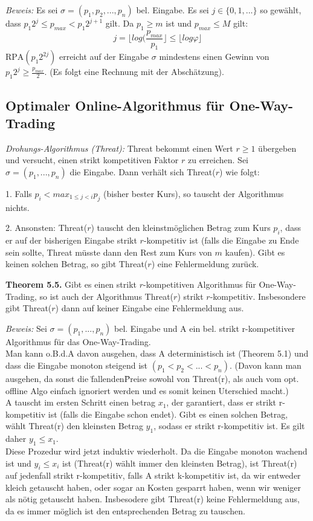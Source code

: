 \textit{Beweis:} Es sei $\sigma = (p_{1}, p_{2}, ..., p_{n})$ bel. Eingabe. Es sei $j \in \{0, 1, ...\}$ so gewählt, dass $p_{1}2^{j} \le p_{max} < p_{1}2^{j+1}$ gilt. Da $p_{1} \ge m$ ist und $p_{max} \le M$ gilt:
$$j = \lfloor log(\frac{p_{max}}{p_{1}} \rfloor \le \lfloor log \varphi \rfloor$$
$\textrm{RPA}(p_{1}2^{2j})$ erreicht auf der Eingabe $\sigma$ mindestens einen Gewinn von $p_{1}2^{j} \ge \frac{p_{max}}{2}$. (Es folgt eine Rechnung mit der Abschätzung).

\subsection{Optimaler Online-Algorithmus für One-Way-Trading}

\textit{Drohungs-Algorithmus (Threat):} Threat bekommt einen Wert $r \ge 1$ übergeben und versucht, einen strikt kompetitiven Faktor $r$ zu erreichen. Sei $\sigma = (p_{1}, ..., p_{n})$ die Eingabe. Dann verhält sich Threat($r$) wie folgt:

1. Falls $p_{i} < max_{1 \le j < i}p_{j}$ (bisher bester Kurs), so tauscht der Algorithmus nichts.

2. Ansonsten: Threat($r$) tauscht den kleinstmöglichen Betrag zum Kurs $p_{i}$, dass er auf der bisherigen Eingabe strikt $r$-kompetitiv ist (falls die Eingabe zu Ende sein sollte, Threat müsste dann den Rest zum Kurs von $m$ kaufen). Gibt es keinen solchen Betrag, so gibt Threat($r$) eine Fehlermeldung zurück.

\textbf{Theorem 5.5.} Gibt es einen strikt $r$-kompetitiven Algorithmus für One-Way-Trading, so ist auch der Algorithmus Threat($r$) strikt $r$-kompetitiv. Insbesondere gibt Threat($r$) dann auf keiner Eingabe eine Fehlermeldung aus.

\textit{Beweis:} Sei $\sigma = (p_{1}, ..., p_{n})$ bel. Eingabe und A ein bel. strikt r-kompetitiver Algorithmus für das One-Way-Trading.\\
Man kann o.B.d.A davon ausgehen, dass A deterministisch ist (Theorem 5.1) und dass die Eingabe monoton steigend ist $(p_{1} < p_{2} <... <p_{n})$. (Davon kann man ausgehen, da sonst die \"fallenden\" Preise sowohl von Threat(r), als auch vom opt. offline Algo einfach ignoriert werden und es somit keinen Uterschied macht.)\\
A tauscht im ersten Schritt einen betrag $x_{1}$, der garantiert, dass er strikt r-kompetitiv ist (falls die Eingabe schon endet). Gibt es einen solchen Betrag, wählt Threat(r) den kleinsten Betrag $y_{1}$, sodass er strikt r-kompetitiv ist. Es gilt daher $y_{1} \le x_{1}$.\\
Diese Prozedur wird jetzt induktiv wiederholt. Da die Eingabe monoton wachend ist und $y_{i} \le x_{i}$ ist (Threat(r) wählt immer den kleinsten Betrag), ist Threat(r) auf jedenfall strikt r-kompetitiv, falls A strikt k-kompetitiv ist, da wir entweder kleich getauscht haben, oder sogar an Kosten gesparrt haben, wenn wir weniger als nötig getauscht haben. Insbesodere gibt Threat(r) keine Fehlermeldung aus, da es immer möglich ist den entsprechenden Betrag zu tauschen.

